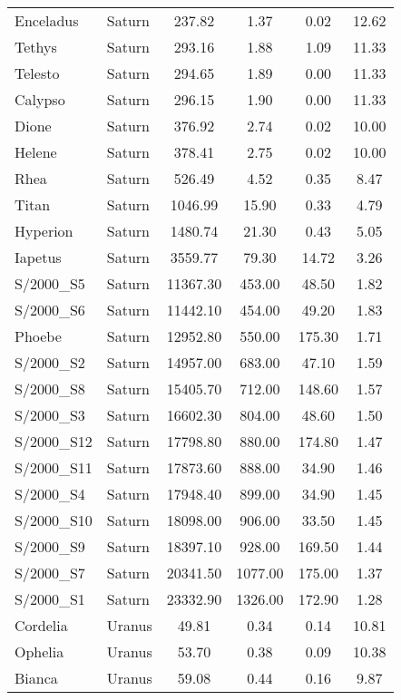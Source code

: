 \documentclass[a4paper,12pt]{scrartcl}
\begin{document}
\begin{longtable}{|l|l|S|S|S|S|}
  Enceladus &  Saturn &  237.82  & 1.37  & 0.02  & 12.62  \\
  Tethys &  Saturn &  293.16  & 1.88  & 1.09  & 11.33  \\
  Telesto &  Saturn &  294.65  & 1.89  & 0.00  & 11.33  \\
  Calypso &  Saturn &  296.15  & 1.90  & 0.00  & 11.33  \\
  Dione &  Saturn &  376.92  & 2.74  & 0.02  & 10.00  \\
  Helene &  Saturn &  378.41  & 2.75  & 0.02  & 10.00  \\
  Rhea &  Saturn &  526.49  & 4.52  & 0.35  & 8.47  \\
  Titan &  Saturn &  1046.99  & 15.90  & 0.33  & 4.79  \\
  Hyperion &  Saturn &  1480.74  & 21.30  & 0.43  & 5.05  \\
  Iapetus &  Saturn &  3559.77  & 79.30  & 14.72  & 3.26  \\
  S/2000\_S5 &  Saturn &  11367.30  & 453.00  & 48.50  & 1.82  \\
  S/2000\_S6 &  Saturn &  11442.10  & 454.00  & 49.20  & 1.83  \\
  Phoebe &  Saturn &  12952.80  & 550.00  & 175.30  & 1.71  \\
  S/2000\_S2 &  Saturn &  14957.00  & 683.00  & 47.10  & 1.59  \\
  S/2000\_S8 &  Saturn &  15405.70  & 712.00  & 148.60  & 1.57  \\
  S/2000\_S3 &  Saturn &  16602.30  & 804.00  & 48.60  & 1.50  \\
  S/2000\_S12 &  Saturn &  17798.80  & 880.00  & 174.80  & 1.47  \\
  S/2000\_S11 &  Saturn &  17873.60  & 888.00  & 34.90  & 1.46  \\
  S/2000\_S4 &  Saturn &  17948.40  & 899.00  & 34.90  & 1.45  \\
  S/2000\_S10 &  Saturn &  18098.00  & 906.00  & 33.50  & 1.45  \\
  S/2000\_S9 &  Saturn &  18397.10  & 928.00  & 169.50  & 1.44  \\
  S/2000\_S7 &  Saturn &  20341.50  & 1077.00  & 175.00  & 1.37  \\
  S/2000\_S1 &  Saturn &  23332.90  & 1326.00  & 172.90  & 1.28  \\
  Cordelia &  Uranus &  49.81  & 0.34  & 0.14  & 10.81  \\
  Ophelia &  Uranus &  53.70  & 0.38  & 0.09  & 10.38  \\
  Bianca &  Uranus &  59.08  & 0.44  & 0.16  & 9.87  \\

\end{longtable}
\end{document}

